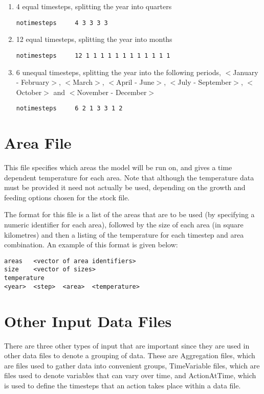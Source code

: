 \documentclass[10pt,twoside]{book}
\begin{document}
\begin{enumerate}
\item 4 equal timesteps, splitting the year into quarters
{\small\begin{verbatim}
notimesteps     4 3 3 3 3
\end{verbatim}}
\item 12 equal timesteps, splitting the year into months
{\small\begin{verbatim}
notimesteps     12 1 1 1 1 1 1 1 1 1 1 1 1
\end{verbatim}}
\item 6 unequal timesteps, splitting the year into the following periods, $<$January - February$>$, $<$March$>$, $<$April - June$>$, $<$July - September$>$, $<$October$>$ and $<$November - December$>$
{\small\begin{verbatim}
notimesteps     6 2 1 3 3 1 2
\end{verbatim}}
\end{enumerate}

\section{Area File}\label{sec:areafile}
This file specifies which areas the model will be run on, and gives a time dependent temperature for each area.  Note that although the temperature data must be provided it need not actually be used, depending on the growth and feeding options chosen for the stock file.

\bigskip
The format for this file is a list of the areas that are to be used (by specifying a numeric identifier for each area), followed by the size of each area (in square kilometres) and then a listing of the temperature for each timestep and area combination.  An example of this format is given below:

{\small\begin{verbatim}
areas   <vector of area identifiers>
size    <vector of sizes>
temperature
<year>  <step>  <area>  <temperature>
\end{verbatim}}

\section{Other Input Data Files}\label{sec:otherinputfile}
There are three other types of input that are important since they are used in other data files to denote a grouping of data.  These are Aggregation files, which are files used to gather data into convenient groups, TimeVariable files, which are files used to denote variables that can vary over time, and ActionAtTime, which is used to define the timesteps that an action takes place within a data file.
\end{document}
